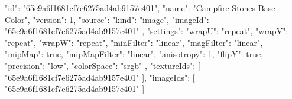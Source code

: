 {
  "id": "65e9a6f1681cf7e6275ad4ab9157e401",
  "name": "Campfire Stones Base Color",
  "version": 1,
  "source": {
    "kind": "image",
    "imageId": "65e9a6f1681cf7e6275ad4ab9157e401"
  },
  "settings": {
    "wrapU": "repeat",
    "wrapV": "repeat",
    "wrapW": "repeat",
    "minFilter": "linear",
    "magFilter": "linear",
    "mipMap": true,
    "mipMapFilter": "linear",
    "anisotropy": 1,
    "flipY": true,
    "precision": "low",
    "colorSpace": "srgb"
  },
  "textureIds": [
    "65e9a6f1681cf7e6275ad4ab9157e401"
  ],
  "imageIds": [
    "65e9a6f1681cf7e6275ad4ab9157e401"
  ]
}
